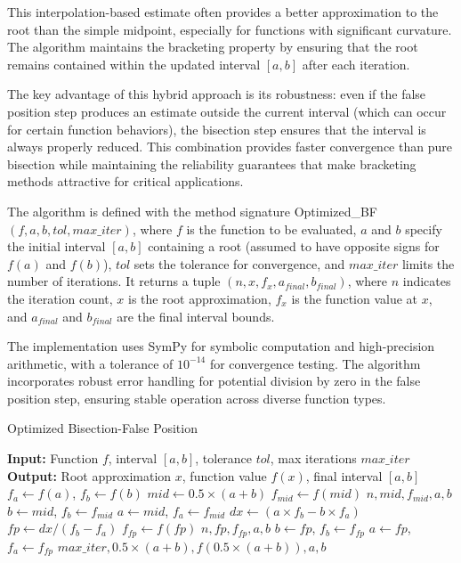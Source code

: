\documentclass[amsmath, amssymb, aps]{revtex4-2}
\begin{document}
This interpolation-based estimate often provides a better approximation to the root than the simple midpoint, especially for functions with significant curvature. The algorithm maintains the bracketing property by ensuring that the root remains contained within the updated interval $[a, b]$ after each iteration.

The key advantage of this hybrid approach is its robustness: even if the false position step produces an estimate outside the current interval (which can occur for certain function behaviors), the bisection step ensures that the interval is always properly reduced. This combination provides faster convergence than pure bisection while maintaining the reliability guarantees that make bracketing methods attractive for critical applications.

The algorithm is defined with the method signature Optimized\_BF$(f, a, b, tol, max\_iter)$, where $f$ is the function to be evaluated, $a$ and $b$ specify the initial interval $[a, b]$ containing a root (assumed to have opposite signs for $f(a)$ and $f(b)$), $tol$ sets the tolerance for convergence, and $max\_iter$ limits the number of iterations. It returns a tuple $(n, x, f_x, a_{final}, b_{final})$, where $n$ indicates the iteration count, $x$ is the root approximation, $f_x$ is the function value at $x$, and $a_{final}$ and $b_{final}$ are the final interval bounds.

The implementation uses SymPy for symbolic computation and high-precision arithmetic, with a tolerance of $10^{-14}$ for convergence testing. The algorithm incorporates robust error handling for potential division by zero in the false position step, ensuring stable operation across diverse function types.

\begin{algorithm}[H]
\caption{ Optimized Bisection-False Position}
\begin{algorithmic}[1]
\State \textbf{Input:} Function $f$, interval $[a, b]$, tolerance $tol$, max iterations $max\_iter$
\State \textbf{Output:} Root approximation $x$, function value $f(x)$, final interval $[a, b]$
\State $f_a \gets f(a)$, $f_b \gets f(b)$
    \State $mid \gets 0.5 \times (a + b)$
    \State $f_{mid} \gets f(mid)$
        \State \Return $n, mid, f_{mid}, a, b$
    \EndIf
        \State $b \gets mid$, $f_b \gets f_{mid}$
    \Else
        \State $a \gets mid$, $f_a \gets f_{mid}$
    \EndIf
    \State $dx \gets (a \times f_b - b \times f_a)$
    \State $fp \gets dx / (f_b - f_a)$
    \State $f_{fp} \gets f(fp)$
        \State \Return $n, fp, f_{fp}, a, b$
    \EndIf
        \State $b \gets fp$, $f_b \gets f_{fp}$
    \Else
        \State $a \gets fp$, $f_a \gets f_{fp}$
    \EndIf
\EndFor
\State \Return $max\_iter, 0.5 \times (a + b), f(0.5 \times (a + b)), a, b$
\end{algorithmic}
\end{algorithm}
\end{document}
